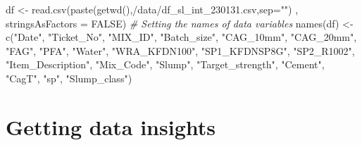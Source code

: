 \documentclass[
]{article}
\newenvironment{Shaded}{\begin{snugshade}}{\end{snugshade}}
\newcommand{\AttributeTok}[1]{\textcolor[rgb]{0.77,0.63,0.00}{#1}}
\newcommand{\CommentTok}[1]{\textcolor[rgb]{0.56,0.35,0.01}{\textit{#1}}}
\newcommand{\ConstantTok}[1]{\textcolor[rgb]{0.00,0.00,0.00}{#1}}
\newcommand{\FunctionTok}[1]{\textcolor[rgb]{0.00,0.00,0.00}{#1}}
\newcommand{\NormalTok}[1]{#1}
\newcommand{\OtherTok}[1]{\textcolor[rgb]{0.56,0.35,0.01}{#1}}
\newcommand{\StringTok}[1]{\textcolor[rgb]{0.31,0.60,0.02}{#1}}
\begin{document}
\begin{Shaded}
\begin{Highlighting}[]
\NormalTok{df }\OtherTok{\textless{}{-}} \FunctionTok{read.csv}\NormalTok{(}\FunctionTok{paste}\NormalTok{(}\FunctionTok{getwd}\NormalTok{(),}\StringTok{\textquotesingle{}/data/df\_sl\_int\_230131.csv\textquotesingle{}}\NormalTok{,}\AttributeTok{sep=}\StringTok{""}\NormalTok{)}
\NormalTok{               , }\AttributeTok{stringsAsFactors =} \ConstantTok{FALSE}\NormalTok{)}
\CommentTok{\# Setting the names of data variables}
\FunctionTok{names}\NormalTok{(df) }\OtherTok{\textless{}{-}} \FunctionTok{c}\NormalTok{(}\StringTok{"Date"}\NormalTok{, }\StringTok{"Ticket\_No"}\NormalTok{, }\StringTok{"MIX\_ID"}\NormalTok{, }\StringTok{"Batch\_size"}\NormalTok{, }\StringTok{"CAG\_10mm"}\NormalTok{,}
               \StringTok{"CAG\_20mm"}\NormalTok{, }\StringTok{"FAG"}\NormalTok{, }\StringTok{"PFA"}\NormalTok{, }\StringTok{"Water"}\NormalTok{, }\StringTok{"WRA\_KFDN100"}\NormalTok{,}
               \StringTok{"SP1\_KFDNSP8G"}\NormalTok{, }\StringTok{"SP2\_R1002"}\NormalTok{, }\StringTok{"Item\_Description"}\NormalTok{, }\StringTok{"Mix\_Code"}\NormalTok{,}
               \StringTok{"Slump"}\NormalTok{, }\StringTok{"Target\_strength"}\NormalTok{, }\StringTok{"Cement"}\NormalTok{, }\StringTok{"CagT"}\NormalTok{, }\StringTok{"sp"}\NormalTok{,}
               \StringTok{"Slump\_class"}\NormalTok{)}
\end{Highlighting}
\end{Shaded}

\hypertarget{getting-data-insights}{%
\section{Getting data insights}\label{getting-data-insights}}
\end{document}
